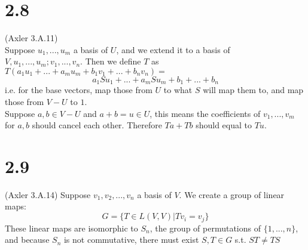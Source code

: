 \documentclass{article}
\begin{document}
\section{2.8}
(Axler 3.A.11)\\
Suppose $u_1, ..., u_m$ a basis of $U$, and we extend it to a basis of $V, u_1, ..., u_m; v_1, ..., v_n$. Then we define $T$ as $T(a_1u_1 + ... + a_mu_m + b_1v_1 + ... + b_nv_n) = $
\begin{equation*}
    a_1Su_1 + ... + a_mSu_m + b_1 + ... + b_n
\end{equation*}
i.e. for the base vectors, map those from $U$ to what $S$ will map them to, and map those from $V - U$ to $1$.\\
Suppose $a,b \in V - U$ and $a+b = u \in U$, this means the coefficients of $v_1, ..., v_m$ for $a, b$ should cancel each other. Therefore $Ta + Tb$ should equal to $Tu$.
\section{2.9}
(Axler 3.A.14)
Suppose $v_1, v_2, ..., v_n$ a basis of $V$. We create a group of linear maps:
\begin{equation*}
    G = \{T \in L(V, V)| Tv_i = v_j\}
\end{equation*}
These linear maps are isomorphic to $S_n$, the group of permutations of $\{1, ..., n\}$, and because $S_n$ is not commutative, there must exist $S, T \in G$ s.t. $ST \neq TS$
\end{document}

